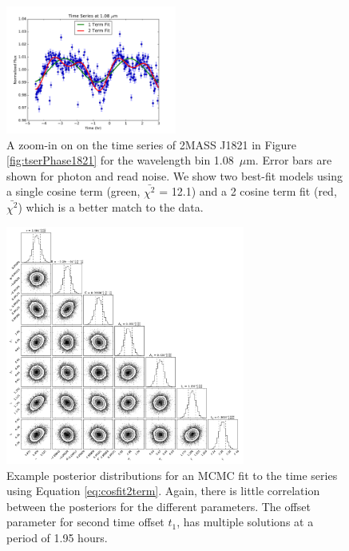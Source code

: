 \documentclass[twocolumn]{aastex6}
\begin{document}
\begin{figure}
\begin{centering}
\includegraphics[width=0.5\textwidth]{best_fit_2term.pdf}
\caption{A zoom-in on on the time series of 2MASS J1821 in Figure \ref{fig:tserPhase1821} for the wavelength bin 1.08~$\mu$m. Error bars are shown for photon and read noise. We show two best-fit models using a single cosine term (green, $\bar{\chi^2}$ = 12.1) and a 2 cosine term fit (red, $\bar{\chi^2}$) which is a better match to the data.}\label{fig:model2Cosfit}
\end{centering}
\end{figure}


\begin{figure}
\begin{centering}
\includegraphics[width=0.7\textwidth]{corner_fit_2term.pdf}
\caption{Example posterior distributions for an MCMC fit to the time series using Equation \ref{eq:cosfit2term}.
Again, there is little correlation between the posteriors for the different parameters.
The offset parameter for second time offset $t_1$, has multiple solutions at a period of 1.95 hours.}\label{fig:post2Cosfit}
\end{centering}
\end{figure}
\end{document}
